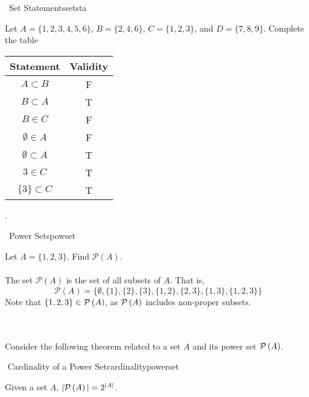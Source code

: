         \begin{exercise}{\Difficulty\,\Difficulty\,\,Set Statements}{setsta}
    
            Let \(A=\{1,2,3,4,5,6\}\), \(B=\{2,4,6\}\), \(C=\{1,2,3\}\), and \(D=\{7,8,9\}\). Complete the table
            \begin{center}
                \begin{tabular}{c|c}
                    \hline
                    Statement & Validity \\
                    \hline
                    \(A\subset B\) & F \\
                    \(B\subset A\) & T \\
                    \(B\in C\) & F \\
                    \(\emptyset \in A\) & F \\
                    \(\emptyset \subset A\) & T \\
                    \(3\in C\) & T \\
                    \(\{3\}\subset C\) & T \\
                    \hline
                \end{tabular}.
            \end{center}
        
        \end{exercise}
        \begin{exercise}{\Difficulty\,\Difficulty\,\,Power Sets}{powset}
    
            Let \(A=\{1,2,3\}\). Find \(\mathcal{P}(A)\).
            \\
            \\
            The set \(\mathcal{P}(A)\) is the set of all subsets of \(A\). That is,
            \begin{equation*}
                \mathcal{P}(A)=\{\emptyset,\{1\},\{2\},\{3\},\{1,2\},\{2,3\},\{1,3\},\{1,2,3\}\}
            \end{equation*}
            Note that \(\{1,2,3\}\in\mathcal{P}\left(A\right)\), as \(\mathcal{P}\left(A\right)\) includes non-proper subsets.
        
        \end{exercise}
        \vphantom
        \\
        \\
        Consider the following theorem related to a set \(A\) and its power set \(\mathcal{P}\left(A\right)\).
        \begin{theorem}{\Stop\,\,Cardinality of a Power Set}{cardinalitypowerset}
        
            Given a set \(A\), \(|\mathcal{P}\left(A\right)|=2^{|A|}\).
        
        \end{theorem}
